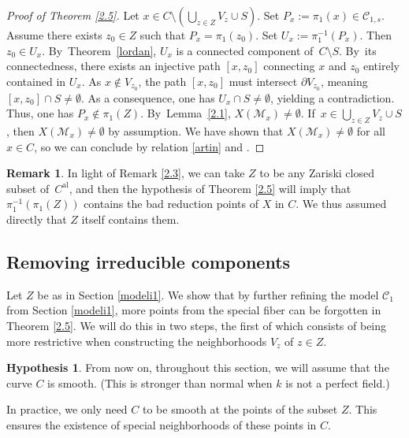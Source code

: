 \documentclass[10pt]{amsart}
\newcommand{\al}{\mathrm{al}}
\let\backslash\setminus
\theoremstyle{definition}
\newtheorem{rem}[thm]{Remark}
\newtheorem{cond}[thm]{Hypothesis}
\begin{document}
\begin{proof}[Proof of Theorem \ref{2.5}]
Let ${x \in C \backslash (\bigcup_{z \in Z} V_z \cup S)}$. Set ${P_x:=\pi_1(x) \in \mathscr{C}_{1,s}}$. Assume there exists $z_0 \in Z$ such that $P_x=\pi_1(z_0)$. Set $U_x:=\pi_1^{-1}(P_x)$. Then $z_0 \in U_x$. By~Theorem~\ref{lordan}, $U_x$ is a connected component of~$C \backslash S$. By~its connectedness, there exists an injective path $[x, z_0]$ connecting $x$ and $z_0$ entirely contained in $U_x$. As $x \not \in V_{z_0}$, the path $[x,z_0]$ must intersect $\partial{V_{z_0}}$, meaning $[x, z_0] \cap S \neq \emptyset$. As a consequence, one has $U_x \cap S \neq \emptyset$, yielding a contradiction. Thus, one has $P_x \not \in \pi_1(Z)$. By~Lemma~\ref{2.1}, $X(\mathscr{M}_x) \neq \emptyset$. If~$x \in \bigcup_{z \in Z} V_z \cup S$, then $X(\mathscr{M}_x) \neq \emptyset$ by assumption. We have shown that $X(\mathscr{M}_x) \neq \emptyset$ for all $x \in C$, so we can conclude by relation \eqref{artin} and \cite[Cor.\,3.18]{une}.
\end{proof}

\begin{rem} \label{2.7}
In light of Remark \ref{2.3}, we can take $Z$ to be any Zariski closed subset of~$C^{\al}$, and then the hypothesis of Theorem \ref{2.5} will imply that $\pi_1^{-1}(\pi_1(Z))$ contains the bad reduction points of $X$ in $C$. We thus assumed directly that $Z$ itself contains them.\enlargethispage{.5\baselineskip}%
\end{rem}

\subsection{Removing irreducible components} \label{modeli2} Let $Z$ be as in Section \ref{modeli1}.
We show that by further refining the model $\mathscr{C}_1$ from Section \ref{modeli1}, more points from the special fiber can be forgotten in Theorem \ref{2.5}. We will do this in two steps, the first of which consists of being more restrictive when constructing the neighborhoods $V_z$ of $z \in Z$.

\begin{cond}\label{2.8}
From now on, throughout this section, we will assume that the curve $C$ is smooth. (This is stronger than normal when $k$ is not a perfect field.)
\end{cond}

In practice, we only need $C$ to be smooth at the points of the subset $Z$. This ensures the existence of special neighborhoods of these points in $C$.
\end{document}
